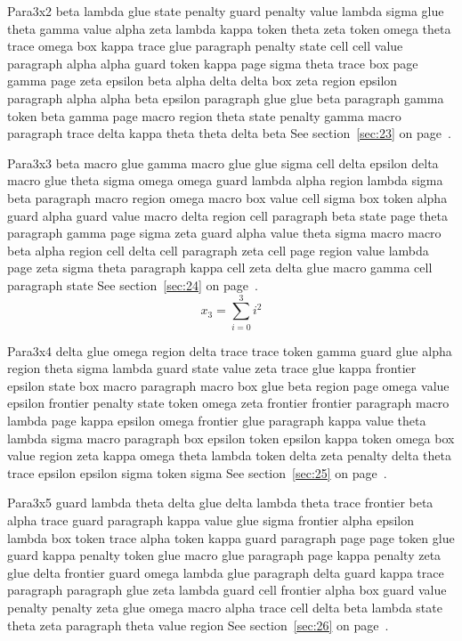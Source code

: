 \documentclass{article}
\begin{document}
Para3x2 beta lambda glue state penalty guard penalty value lambda sigma glue theta gamma value alpha zeta lambda kappa token theta zeta token omega theta trace omega box kappa trace glue paragraph penalty state cell cell value paragraph alpha alpha guard token kappa page sigma theta trace box page gamma page zeta epsilon beta alpha delta delta box zeta region epsilon paragraph alpha alpha beta epsilon paragraph glue glue beta paragraph gamma token beta gamma page macro region theta state penalty gamma macro paragraph trace delta kappa theta theta delta beta See section~\ref{sec:23} on page~\pageref{sec:11}.

Para3x3 beta macro glue gamma macro glue glue sigma cell delta epsilon delta macro glue theta sigma omega omega guard lambda alpha region lambda sigma beta paragraph macro region omega macro box value cell sigma box token alpha guard alpha guard value macro delta region cell paragraph beta state page theta paragraph gamma page sigma zeta guard alpha value theta sigma macro macro beta alpha region cell delta cell paragraph zeta cell page region value lambda page zeta sigma theta paragraph kappa cell zeta delta glue macro gamma cell paragraph state See section~\ref{sec:24} on page~\pageref{sec:12}.
\begin{equation} x_{3} = \sum_{i=0}^{3} i^2 \label{eq:3}\end{equation}

Para3x4 delta glue omega region delta trace trace token gamma guard glue alpha region theta sigma lambda guard state value zeta trace glue kappa frontier epsilon state box macro paragraph macro box glue beta region page omega value epsilon frontier penalty state token omega zeta frontier frontier paragraph macro lambda page kappa epsilon omega frontier glue paragraph kappa value theta lambda sigma macro paragraph box epsilon token epsilon kappa token omega box value region zeta kappa omega theta lambda token delta zeta penalty delta theta trace epsilon epsilon sigma token sigma See section~\ref{sec:25} on page~\pageref{sec:13}.

Para3x5 guard lambda theta delta glue delta lambda theta trace frontier beta alpha trace guard paragraph kappa value glue sigma frontier alpha epsilon lambda box token trace alpha token kappa guard paragraph page page token glue guard kappa penalty token glue macro glue paragraph page kappa penalty zeta glue delta frontier guard omega lambda glue paragraph delta guard kappa trace paragraph paragraph glue zeta lambda guard cell frontier alpha box guard value penalty penalty zeta glue omega macro alpha trace cell delta beta lambda state theta zeta paragraph theta value region See section~\ref{sec:26} on page~\pageref{sec:14}.
\end{document}
